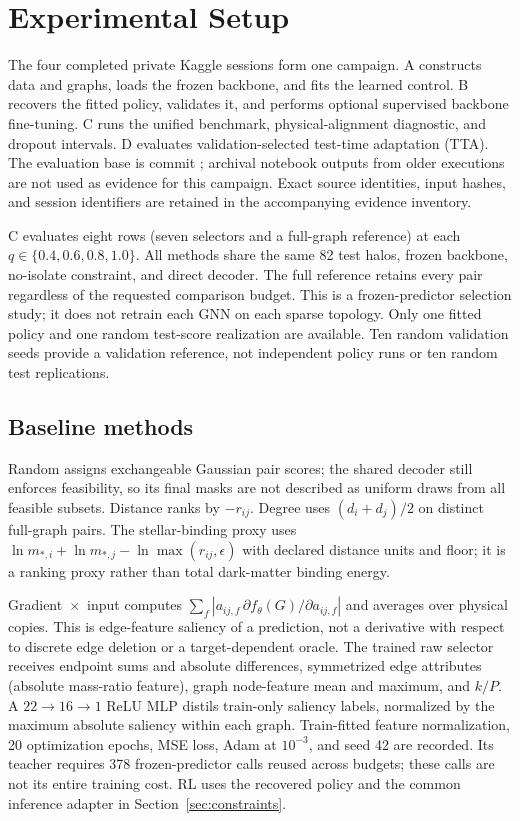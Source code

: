 \section{Experimental Setup}
\label{sec:experiments}
The four completed private Kaggle sessions form one campaign. A constructs data and graphs, loads the frozen backbone, and fits the learned control. B recovers the fitted policy, validates it, and performs optional supervised backbone fine-tuning. C runs the unified benchmark, physical-alignment diagnostic, and dropout intervals. D evaluates validation-selected test-time adaptation (TTA). The evaluation base is commit ; archival notebook outputs from older executions are not used as evidence for this campaign. Exact source identities, input hashes, and session identifiers are retained in the accompanying evidence inventory.

C evaluates eight rows (seven selectors and a full-graph reference) at each $q\in\{0.4,0.6,0.8,1.0\}$. All methods share the same 82 test halos, frozen backbone, no-isolate constraint, and direct decoder. The full reference retains every pair regardless of the requested comparison budget. This is a frozen-predictor selection study; it does not retrain each GNN on each sparse topology. Only one fitted policy and one random test-score realization are available. Ten random validation seeds provide a validation reference, not independent policy runs or ten random test replications.

\subsection{Baseline methods}
Random assigns exchangeable Gaussian pair scores; the shared decoder still enforces feasibility, so its final masks are not described as uniform draws from all feasible subsets. Distance ranks by $-r_{ij}$. Degree uses $(d_i+d_j)/2$ on distinct full-graph pairs. The stellar-binding proxy uses $\ln m_{*,i}+\ln m_{*,j}-\ln\max(r_{ij},\epsilon)$ with declared distance units and floor; it is a ranking proxy rather than total dark-matter binding energy.

Gradient~$\times$~input computes $\sum_f|a_{ij,f}\,\partial f_\theta(G)/\partial a_{ij,f}|$ and averages over physical copies. This is edge-feature saliency of a prediction, not a derivative with respect to discrete edge deletion or a target-dependent oracle. The trained raw selector receives endpoint sums and absolute differences, symmetrized edge attributes (absolute mass-ratio feature), graph node-feature mean and maximum, and $k/P$. A $22\to16\to1$ ReLU MLP distils train-only saliency labels, normalized by the maximum absolute saliency within each graph. Train-fitted feature normalization, 20 optimization epochs, MSE loss, Adam at $10^{-3}$, and seed 42 are recorded. Its teacher requires 378 frozen-predictor calls reused across budgets; these calls are not its entire training cost. RL uses the recovered policy and the common inference adapter in Section~\ref{sec:constraints}.

